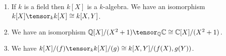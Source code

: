 \begin{enumerate}[label=(\roman*)]
	\item If $k$ is a field then $k[X]$ is a $k$-algebra. We have an
		isomorphism $k[X]\tensor_k k[X] \cong k[X, Y]$.
	\item We have an isomorphism  $\mathbb{Q}[X]/(X^2+1)\tensor_\mathbb{Q} \mathbb{C} \cong \mathbb{C}[X]/(X^2+1)$.
	\item We have $k[X]/(f) \tensor_k k[X]/(g) \cong k[X, Y]/(f(X), g(Y))$.
\end{enumerate}
